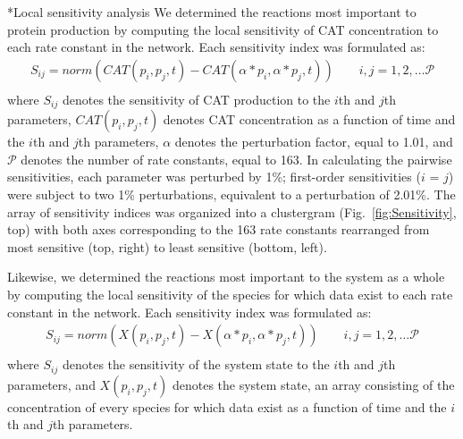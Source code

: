 \documentclass[12pt]{article}
\makeatletter
\renewcommand\subsection{\@startsection
	{subsection}{2}{0mm}
	{-0.05in}
	{-0.5\baselineskip}
	{\normalfont\normalsize\bfseries}}
\makeatother
\begin{document}
\subsection*{Local sensitivity analysis}
We determined the reactions most important to protein production by computing the local sensitivity of CAT concentration to each rate constant in the network.
Each sensitivity index was formulated as:
\begin{equation}\label{eqn:local-sensitivity}
\begin{split}
    S_{ij}=norm(CAT(p_i,p_j,t)-CAT(\alpha*p_i,\alpha*p_j,t))\qquad{i,j=1,2,\hdots\mathcal{P}}\\
\end{split}
\end{equation}
where $S_{ij}$ denotes the sensitivity of CAT production to the $i$th and $j$th parameters, $CAT(p_i,p_j,t)$ denotes CAT concentration as a function of time and the $i$th and $j$th parameters, $\alpha$ denotes the perturbation factor, equal to 1.01, and $\mathcal{P}$ denotes the number of rate constants, equal to 163.
In calculating the pairwise sensitivities, each parameter was perturbed by 1\%; first-order sensitivities ($i$ = $j$) were subject to two 1\% perturbations, equivalent to a perturbation of 2.01\%.
The array of sensitivity indices was organized into a clustergram (Fig.~\ref{fig:Sensitivity}, top) with both axes corresponding to the 163 rate constants rearranged from most sensitive (top, right) to least sensitive (bottom, left).

Likewise, we determined the reactions most important to the system as a whole by computing the local sensitivity of the species for which data exist to each rate constant in the network.
Each sensitivity index was formulated as:
\begin{equation}\label{eqn:local-sensitivity}
\begin{split}
    S_{ij}=norm(X(p_i,p_j,t)-X(\alpha*p_i,\alpha*p_j,t))\qquad{i,j=1,2,\hdots\mathcal{P}}\\
\end{split}
\end{equation}
where $S_{ij}$ denotes the sensitivity of the system state to the $i$th and $j$th parameters, and $X(p_i,p_j,t)$ denotes the system state, an array consisting of the concentration of every species for which data exist as a function of time and the $i$th and $j$th parameters.
\end{document}
